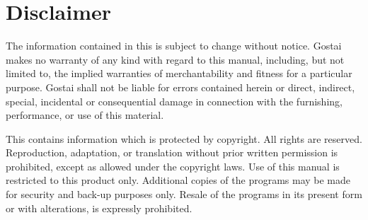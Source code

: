 \begin{minipage}[c]{.5\textwidth}
  \chapter*{Disclaimer}

  The information contained in this
   is subject to change
  without notice. Gostai makes no warranty of any kind with regard to this
  manual, including, but not limited to, the implied warranties of
  merchantability and fitness for a particular purpose. Gostai shall not be
  liable for errors contained herein or direct, indirect, special,
  incidental or consequential damage in connection with the furnishing,
  performance, or use of this material.

  \bigskip

  This  contains
  information which is protected by copyright. All rights are
  reserved. Reproduction, adaptation, or translation without prior written
  permission is prohibited, except as allowed under the copyright laws. Use
  of this manual is restricted to this product only. Additional copies of
  the programs may be made for security and back-up purposes only. Resale of
  the programs in its present form or with alterations, is expressly
  prohibited.
\end{minipage}


